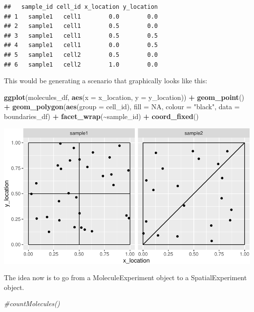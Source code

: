 \documentclass[
]{article}
\newenvironment{Shaded}{\begin{snugshade}}{\end{snugshade}}
\newcommand{\CommentTok}[1]{\textcolor[rgb]{0.56,0.35,0.01}{\textit{#1}}}
\newcommand{\DataTypeTok}[1]{\textcolor[rgb]{0.13,0.29,0.53}{#1}}
\newcommand{\KeywordTok}[1]{\textcolor[rgb]{0.13,0.29,0.53}{\textbf{#1}}}
\newcommand{\NormalTok}[1]{#1}
\newcommand{\OperatorTok}[1]{\textcolor[rgb]{0.81,0.36,0.00}{\textbf{#1}}}
\newcommand{\OtherTok}[1]{\textcolor[rgb]{0.56,0.35,0.01}{#1}}
\newcommand{\StringTok}[1]{\textcolor[rgb]{0.31,0.60,0.02}{#1}}
\begin{document}
\begin{verbatim}
##   sample_id cell_id x_location y_location
## 1   sample1   cell1        0.0        0.0
## 2   sample1   cell1        0.5        0.0
## 3   sample1   cell1        0.5        0.5
## 4   sample1   cell1        0.0        0.5
## 5   sample1   cell2        0.5        0.0
## 6   sample1   cell2        1.0        0.0
\end{verbatim}

This would be generating a scenario that graphically looks like this:

\begin{Shaded}
\begin{Highlighting}[]
\KeywordTok{ggplot}\NormalTok{(molecules\_df, }\KeywordTok{aes}\NormalTok{(}\DataTypeTok{x =}\NormalTok{ x\_location, }\DataTypeTok{y =}\NormalTok{ y\_location)) }\OperatorTok{+}
\StringTok{  }\KeywordTok{geom\_point}\NormalTok{() }\OperatorTok{+}
\StringTok{  }\KeywordTok{geom\_polygon}\NormalTok{(}\KeywordTok{aes}\NormalTok{(}\DataTypeTok{group =}\NormalTok{ cell\_id),}
                    \DataTypeTok{fill =} \OtherTok{NA}\NormalTok{,}
                    \DataTypeTok{colour =} \StringTok{"black"}\NormalTok{,}
                    \DataTypeTok{data =}\NormalTok{ boundaries\_df) }\OperatorTok{+}
\StringTok{  }\KeywordTok{facet\_wrap}\NormalTok{(}\OperatorTok{\textasciitilde{}}\NormalTok{sample\_id) }\OperatorTok{+}
\StringTok{  }\KeywordTok{coord\_fixed}\NormalTok{()}
\end{Highlighting}
\end{Shaded}

\includegraphics{bioconductor_vignette_files/figure-latex/unnamed-chunk-17-1.pdf}

The idea now is to go from a MoleculeExperiment object to a
SpatialExperiment object.

\begin{Shaded}
\begin{Highlighting}[]
\CommentTok{\#countMolecules()}
\end{Highlighting}
\end{Shaded}
\end{document}
